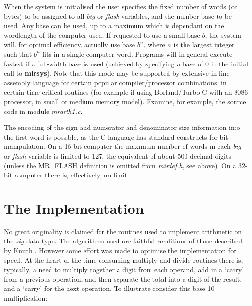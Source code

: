       When the system is initialised the user specifies the fixed number of 
      words (or bytes) to be assigned to all {\em big}  or  {\em flash}  variables, 
      and the number base to be used. Any base can be used, up to a maximum 
      which is dependant on the wordlength of the computer used. If 
      requested  to  use  a  small  base  $b$,  the system will,  for optimal   
      efficiency, actually use base $b^{n}$, where $n$ is the largest integer 
      such that $b^{n}$ fits in a single computer word. Programs will in 
general execute fastest if a full-width base is used (achieved by specifying a 
base of 0 in the initial call to {\bf mirsys}). Note that this mode may be 
supported by extensive in-line assembly language for certain popular 
compiler/processor combinations, in certain time-critical routines (for 
example if using Borland/Turbo C with an 8086 processor, in small or medium 
memory model). Examine, for example, the source code in module {\em mrarth1.c}.  

      The   encoding  of  the  sign  and  numerator  and  denominator  size 
      information into the first word is possible,  as the C  language  has 
      standard  constructs  for bit manipulation.  On a 16-bit computer the 
      maximum number of words in each {\em big} or {\em flash} variable is 
limited to  127, the  equivalent of about 500 decimal digits (unless the 
MR\_FLASH definition is omitted from {\em mirdef.h}, see above).  On a 
32-bit computer there is, effectively, no limit.  


\cleardoublepage
\chapter{The Implementation}

      
      No  great  originality  is claimed for the routines used to implement 
      arithmetic on the {\em big} data-type.  The algorithms used are  faithful 
      renditions  of  those described by Knuth \cite[\$4.3.1]{Knuth81}. However
      some 
      effort was made to optimise the  implementation  for  speed.  At  the 
      heart  of  the  time-consuming multiply and divide routines there is, 
      typically,  a need  to  multiply  together  a  digit  from  each 
      operand,  add  in  a  `carry'  from  a  previous operation,  and then 
      separate the total into a digit of the result,  and a `carry' for the 
      next   operation.   To   illustrate consider  this base  10 
      multiplication: 

